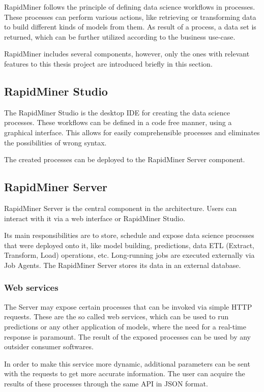RapidMiner follows the principle of defining data science workflows in processes. These processes can perform various actions, like retrieving or transforming data to build different kinds of models from them. As result of a process, a data set is returned, which can be further utilized according to the business use-case.

RapidMiner includes several components, however, only the ones with relevant features to this thesis project are introduced briefly in this section. \cite{rapidminer-server-arch}

\subsection{RapidMiner Studio}

The RapidMiner Studio is the desktop IDE for creating the data science processes. These workflows can be defined in a code free manner, using a graphical interface. This allows for easily comprehensible processes and eliminates the possibilities of wrong syntax.

The created processes can be deployed to the RapidMiner Server component.

\subsection{RapidMiner Server}

RapidMiner Server is the central component in the architecture. Users can interact with it via a web interface or RapidMiner Studio.

Its main responsibilities are to store, schedule and expose data science processes that were deployed onto it, like model building, predictions, data ETL (Extract, Transform, Load) operations, etc. Long-running jobs are executed externally via Job Agents. The RapidMiner Server stores its data in an external database.

\subsubsection{Web services}
The Server may expose certain processes that can be invoked via simple HTTP requests. These are the so called web services, which can be used to run predictions or any other application of models, where the need for a real-time response is paramount. The result of the exposed processes can be used by any outsider consumer softwares.

In order to make this service more dynamic, additional parameters can be sent with the requests to get more accurate information. The user can acquire the results of these processes through the same API in JSON format.

